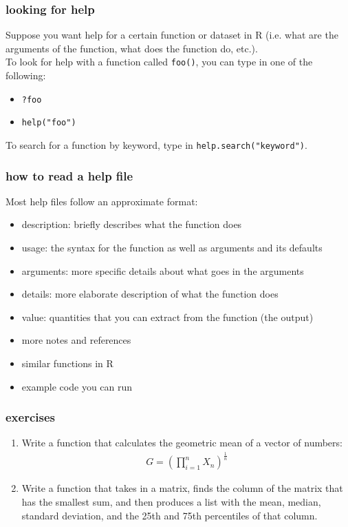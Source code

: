 \documentclass[handout]{beamer}
\newcommand{\red}{\color{red}}
\begin{document}
\begin{frame}
\frametitle{looking for help}
Suppose you want help for a certain function or dataset in R (i.e. what are the arguments of the function, what does the function do, etc.).\\ 
\bigskip
\pause To look for help with a function called {\tt foo()}, you can type in one of the following:
\pause
\begin{itemize}
\red
\item {\tt ?foo}
\item {\tt help("foo")}
\end{itemize}
\pause
\bigskip
To search for a function by keyword, type in {\tt \red help.search("keyword")}.
\end{frame}

\begin{frame}
\frametitle{how to read a help file}
\pause
Most help files follow an approximate format:
\bigskip
\begin{itemize}
\item description: briefly describes what the function does
\item usage: the syntax for the function as well as arguments and its defaults
\item arguments: more specific details about what goes in the arguments
\item details: more elaborate description of what the function does
\item value: quantities that you can extract from the function (the output)
\item more notes and references
\item similar functions in R
\item example code you can run
\end{itemize}
\end{frame}


\begin{frame}
\frametitle{exercises}
\begin{enumerate}
\item Write a function that calculates the geometric mean of a vector of numbers:
\begin{eqnarray*}
G =  \left( \prod^n_{i=1} X_n \right) ^ {\frac{1}{n}}
\end{eqnarray*}
\item Write a function that takes in a matrix, finds the column of the matrix that has the smallest sum, and then produces a list with the mean, median, standard deviation, and the 25th and 75th percentiles of that column.
\end{enumerate}
\end{frame}
\end{document}
